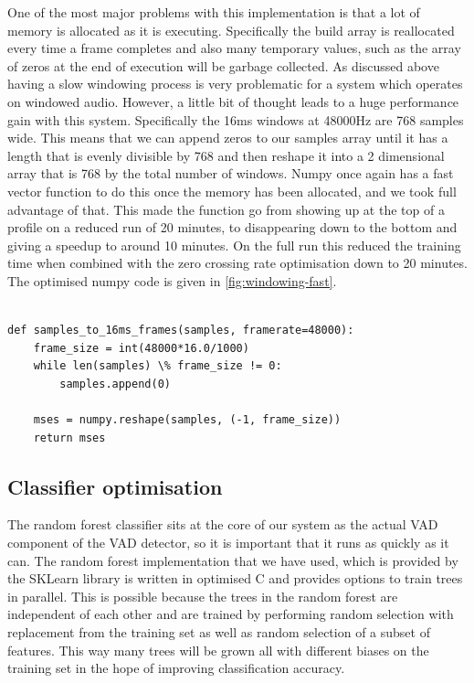 \documentclass[ %
                    author={Sam Phippen},
                supervisor={Dr. Rafal Bogacz},
                     title={Real time voice activity detectors in noisy personal computing environments},
                  subtitle={},
                    degree={MEng},
                      year={2012} ]{thesis}
\begin{document}
One of the most major problems with this implementation is that a lot of memory
is allocated as it is executing. Specifically the build array is reallocated
every time a frame completes and also many temporary values, such as the array
of zeros at the end of execution will be garbage collected. As discussed above
having a slow windowing process is very problematic for a system which operates
on windowed audio. However, a little bit of thought leads to a huge performance
gain with this system. Specifically the 16ms windows at 48000Hz are 768 samples
wide. This means that we can append zeros to our samples array until it has a
length that is evenly divisible by 768 and then reshape it into a 2 dimensional
array that is 768 by the total number of windows. Numpy once again has a fast
vector function to do this once the memory has been allocated, and we took full
advantage of that. This made the function go from showing up at the top of a
profile on a reduced run of 20 minutes, to disappearing down to the bottom and
giving a speedup to around 10 minutes. On the full run this reduced the
training time when combined with the zero crossing rate optimisation down to 20
minutes. The optimised numpy code is given in \ref{fig:windowing-fast}.

\begin{lstlisting}[frame=single,caption=Optimised windowing implementation, label=list:windowing-fast]

def samples_to_16ms_frames(samples, framerate=48000):
    frame_size = int(48000*16.0/1000)
    while len(samples) \% frame_size != 0:
        samples.append(0)

    mses = numpy.reshape(samples, (-1, frame_size))
    return mses

\end{lstlisting}

\subsection{Classifier optimisation}

The random forest classifier sits at the core of our system as the actual VAD
component of the VAD detector, so it is important that it runs as quickly as it
can. The random forest implementation that we have used, which is provided by
the SKLearn library is written in optimised C and provides options to train
trees in parallel. This is possible because the trees in the random forest are
independent of each other and are trained by performing random selection with
replacement from the training set as well as random selection of a subset of
features. This way many trees will be grown all with different biases on the
training set in the hope of improving classification accuracy.
\end{document}
